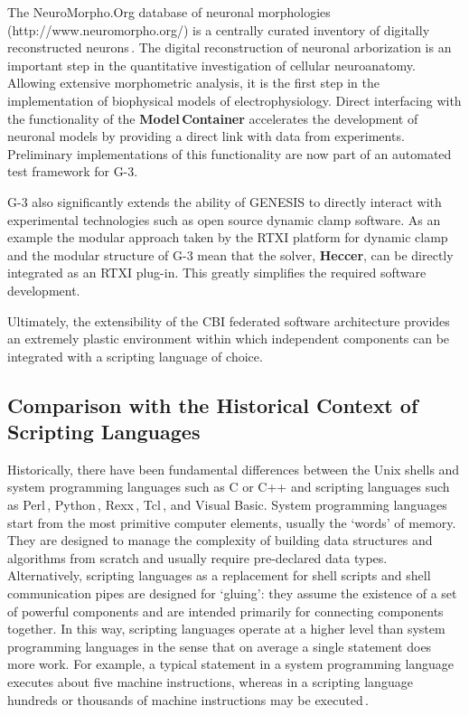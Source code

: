 \documentclass[12pt]{article}
\begin{document}
The NeuroMorpho.Org database of neuronal morphologies
(http://www.neuromorpho.org/) is a centrally curated inventory of
digitally reconstructed neurons\,\cite{ascoli06:_mobil}.  The digital
reconstruction of neuronal arborization is an important step in the
quantitative investigation of cellular neuroanatomy.  Allowing
extensive morphometric analysis, it is the first step in the
implementation of biophysical models of electrophysiology.  Direct
interfacing with the functionality of the {\bf Model\,Container}
accelerates the development of neuronal models by providing a direct
link with data from experiments.  Preliminary implementations of this
functionality are now part of an automated test framework for G-3.

G-3 also significantly extends the ability of GENESIS to directly
interact with experimental technologies such as open source dynamic
clamp software.  As an example the modular approach taken by the RTXI
platform for dynamic
clamp\,\cite{bettencourt08:_effec_imper_dynam_clamp, dorval01:_real}
and the modular structure of G-3 mean that the solver, {\bf Heccer},
can be directly integrated as an RTXI plug-in.  This greatly
simplifies the required software development.

Ultimately, the extensibility of the CBI federated software
architecture provides an extremely plastic environment within which
independent components can be integrated with a scripting language of
choice.


\subsection{Comparison with the Historical Context of Scripting
  Languages}

Historically, there have been fundamental differences between the Unix
shells and system programming languages such as C or C++ and scripting
languages such as Perl\,\cite{wall99:_perl_progr_refer_guide},
Python\,\cite{martelli06:_python_nutsh},
Rexx\,\cite{ohara88:_moder_progr_using_rexx},
Tcl\,\cite{ousterhout94:_tcl_tk_toolk}, and Visual Basic.  System
programming languages start from the most primitive computer elements,
usually the `words' of memory. They are designed to manage the
complexity of building data structures and algorithms from scratch and
usually require pre-declared data types.  Alternatively, scripting
languages as a replacement for shell scripts and shell communication
pipes are designed for `gluing': they assume the existence of a set of
powerful components and are intended primarily for connecting
components together.
In this way, scripting languages operate at a higher level than system programming
languages in the sense that on average a single statement does more
work. For example, a typical statement in a system programming
language executes about five machine instructions, whereas in a
scripting language hundreds or thousands of machine instructions may
be executed\,\cite{ousterhout98:_scrip}.
\end{document}
